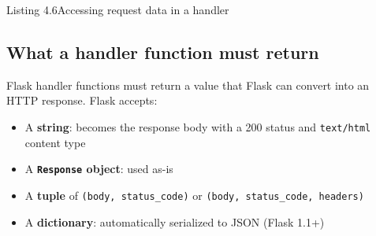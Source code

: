 \begin{codeboxcap}{\textcolor{accent}{Listing 4.6}\enspace Accessing request data in a handler}

\begin{Shaded}
\begin{Highlighting}[]

\OperatorTok{=}\NormalTok{)}

\NormalTok{(}\OperatorTok{=}\NormalTok{[}\NormalTok{])}
\OperatorTok{=}\NormalTok{)}

\OperatorTok{=}\OperatorTok{=}\NormalTok{, }\OperatorTok{=}\NormalTok{)}

\OperatorTok{=}

\OperatorTok{=}

\NormalTok{    \})}
\end{Highlighting}
\end{Shaded}

\end{codeboxcap}

\subsection*{What a handler function must return}\label{04-request-handling-paths:what-a-handler-function-must-return}

Flask handler functions must return a value that Flask can convert into an HTTP response. Flask accepts:

\begin{itemize}
\tightlist
\item
  A \textbf{string}: becomes the response body with a 200 status and \texttt{text/html} content type
\item
  A \textbf{\texttt{Response} object}: used as-is
\item
  A \textbf{tuple} of \texttt{(body,}\allowbreak{}\texttt{\ status\_code)} or \texttt{(body,}\allowbreak{}\texttt{\ status\_}\allowbreak{}\texttt{code,}\allowbreak{}\texttt{\ headers)}
\item
  A \textbf{dictionary}: automatically serialized to JSON (Flask 1.1+)
\end{itemize}

